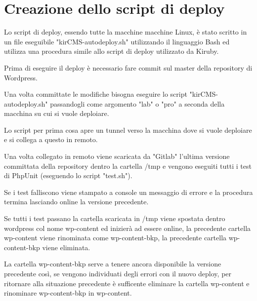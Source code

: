 \section{Creazione dello script di deploy}
Lo script di deploy, essendo tutte la macchine macchine Linux, è stato scritto in un file eseguibile
"kirCMS-autodeploy.sh" utilizzando il linguaggio Bash ed utilizza una procedura simile allo script di deploy 
utilizzato da Kiruby.

Prima di eseguire il deploy è necessario fare commit sul master della repository di Wordpress.

Una volta committate le modifiche bisogna eseguire lo script "kirCMS-autodeploy.sh" passandogli come argomento
"lab" o "pro" a seconda della macchina su cui si vuole deploiare.

Lo script per prima cosa apre un tunnel verso la macchina dove si vuole deploiare e si collega a questo in remoto.

Una volta collegato in remoto viene scaricata da "Gitlab" l'ultima versione committata della repository dentro la cartella /tmp
e vengono eseguiti tutti i test di PhpUnit (eseguendo lo script "test.sh").

Se i test falliscono viene stampato a console un messaggio di errore e la procedura termina lasciando online
la versione precedente.

Se tutti i test passano la cartella scaricata in /tmp viene spostata dentro wordpress col nome wp-content ed inizierà
ad essere online, la precedente cartella wp-content viene rinominata come wp-content-bkp, la precedente cartella wp-content-bkp
viene eliminata.

La cartella wp-content-bkp serve a tenere ancora disponibile la versione precedente così, se vengono individuati
degli errori con il nuovo deploy, per ritornare alla situazione precedente è sufficente eliminare la cartella wp-content
e rinominare wp-content-bkp in wp-content.